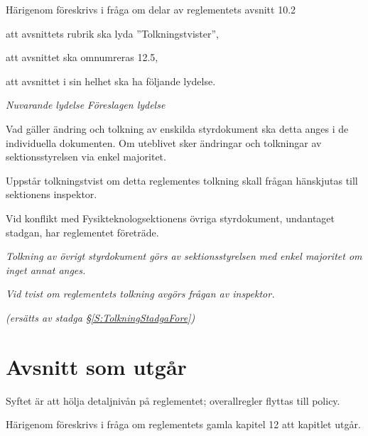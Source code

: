 \documentclass{article}
\newenvironment{lydelse}
    {\begin{paracol}{2}%
        \emph{Nuvarande lydelse}%
        \switchcolumn%
        \emph{Föreslagen lydelse}%
    \end{paracol}%
    \begin{enumerate}[label=\thesubsection.\arabic*]%
    \begin{paracol}{2}%
    }{\end{paracol}\end{enumerate}}
\begin{document}
Härigenom föreskrivs i fråga om delar av reglementets avsnitt 10.2

\begin{dels}
    \item att avsnittets rubrik ska lyda ''Tolkningstvister'',
    \item att avsnittet ska omnumreras 12.5,
    \item att avsnittet i sin helhet ska ha följande lydelse.
\end{dels}
\begin{lydelse}
    \setcounter{section}{10}
    \setcounter{subsection}{2}
    
    \item Vad gäller ändring och tolkning av enskilda styrdokument ska detta anges i de individuella dokumenten. Om uteblivet sker ändringar och tolkningar av sektionsstyrelsen via enkel majoritet. 

	\item Uppstår tolkningstvist om detta reglementes tolkning skall frågan hänskjutas till sektionens inspektor.

    \item Vid konflikt med Fysikteknologsektionens övriga styrdokument, undantaget stadgan, har reglementet företräde.
    
    \setcounter{section}{12}
    \setcounter{subsection}{5}
    \switchcolumn
  
    \item \emph{Tolkning av övrigt styrdokument görs av sektionsstyrelsen med enkel majoritet om inget annat anges.}
    
    \vspace{2.4em}
    \item \emph{Vid tvist om reglementets tolkning avgörs frågan av inspektor.}
    
    \vspace{1.2em}
    \item[] \emph{(ersätts av stadga \S \ref{S:TolkningStadgaFore})}

\end{lydelse}

\section*{Avsnitt som utgår}
Syftet är att hölja detaljnivån på reglementet; overallregler flyttas till policy.

Härigenom föreskrivs i fråga om reglementets gamla kapitel 12 att kapitlet utgår.
\end{document}
